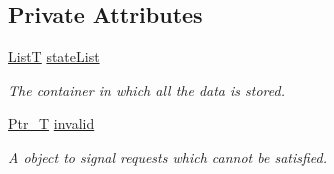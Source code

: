 \subsection*{Private Attributes}
\begin{DoxyCompactItemize}
\item 
\hyperlink{classmsf__core_1_1SortedContainer_abb7bb5ff6c1a1916b8c7e48a50953919}{List\-T} \hyperlink{classmsf__core_1_1SortedContainer_af9bdeecb0097b80a202d5edd044ffda4}{state\-List}
\begin{DoxyCompactList}\small\item\em The container in which all the data is stored. \end{DoxyCompactList}\item 
\hyperlink{classmsf__core_1_1SortedContainer_a0dd7e9676bf540e11f526a8ac16da06b}{Ptr\-\_\-\-T} \hyperlink{classmsf__core_1_1SortedContainer_a60a2f66705f0a77095e763f7dbe2e265}{invalid}
\begin{DoxyCompactList}\small\item\em A object to signal requests which cannot be satisfied. \end{DoxyCompactList}\end{DoxyCompactItemize}


